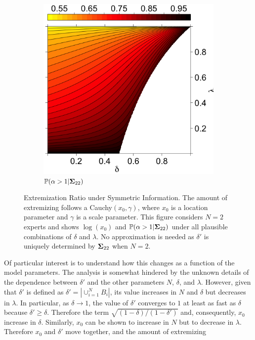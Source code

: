 \documentclass[12pt]{article}
\renewcommand{\P}{\mathbb{P}}
\theoremstyle{definition}
\theoremstyle{definition}
\def\P{{\mathbb P}}
\begin{document}
\begin{figure}[t]
\begin{subfigure}[b]{0.49\textwidth}
                \includegraphics[width=\textwidth, height = \textwidth]{Probs}
\caption{$\P(\alpha > 1 | {\bf\Sigma}_{22})$}
\label{probOracle}
        \end{subfigure}

        \caption{Extremization Ratio under Symmetric Information. The amount of extremizing follows a Cauchy$(x_0, \gamma)$, where $x_0$ is a location parameter and $\gamma$ is a scale parameter. This figure considers  $N = 2$ experts and shows $\log(x_0)$ and $\P(\alpha > 1 | {\bf\Sigma}_{22})$ under all plausible combinations of $\delta$ and $\lambda$. No approximation is needed as $\delta'$ is uniquely determined by ${\bf\Sigma}_{22}$ when $N = 2$.}
        \label{LevelplotsOracle}
\end{figure}
Of particular interest is to understand how this changes as a function of the model parameters. The analysis is somewhat hindered by the unknown details of the dependence between $\delta'$ and the other parameters $N$, $\delta$, and $\lambda$. However, given that $\delta'$ is defined as $\delta' = |\cup_{i=1}^N B_i|$, its value  increases in $N$ and $\delta$ but decreases in $\lambda$. In particular, as $\delta \to 1$, the value of $\delta'$ converges to $1$ at least as fast as $\delta$ because  $\delta' \geq \delta$. Therefore the term $\sqrt{(1-\delta)/(1-\delta')}$ and, consequently, $x_0$ increase in $\delta$. Similarly, $x_0$ can be shown to increase in $N$ but to decrease in $\lambda$. Therefore $x_0$ and $\delta'$ move together, and the amount of extremizing
\end{document}
